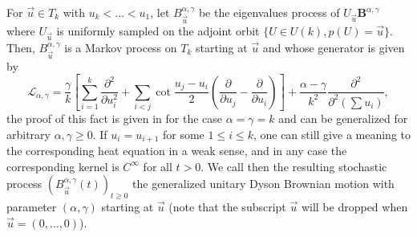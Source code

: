 \documentclass[10pt,11pt]{amsart}%
\begin{document}
For $\vec{u}\in  T_{k}$ with $u_k<\dots<u_1$, let $B^{\alpha,\gamma}_{\vec{u}}$ be the eigenvalues process of $U_{\vec{u}}\mathbf{B}^{\alpha,\gamma}$ where $U_{\vec{u}}$ is uniformly sampled on the adjoint orbit $\{U\in U(k), p(U)=\vec{u}\}$. Then, $B^{\alpha,\gamma}_{\vec{u}}$ is a Markov process on $ T_{k}$ starting at $\vec{u}$ and whose generator is given by 
\begin{equation}\label{eq:generator_Brownian_Motion}
\mathcal{L}_{\alpha,\gamma}=\frac{\gamma}{k}\left[\sum_{i=1}^k\frac{\partial^2}{\partial u_i^2}+\sum_{i<j}\cot \frac{u_j-u_i}{2}\left(\frac{\partial}{\partial u_j}-\frac{\partial}{\partial u_i}\right)\right]+\frac{\alpha-\gamma}{k^2}\frac{\partial^2}{\partial^2(\sum u_i)},
\end{equation}
the proof of this fact is given in \cite[Proposition 12.5.1]{Far} for the case $\alpha=\gamma=k$ and can be generalized for arbitrary $\alpha,\gamma\geq 0$. If $u_i=u_{i+1}$ for some $1\leq i\leq k$, one can still give a meaning to the corresponding heat equation in a weak sense, and in any case the corresponding kernel is $C^{\infty}$ for all $t>0$.  We call then the resulting stochastic process $(B^{\alpha,\gamma}_{\vec{u}}(t))_{t\geq 0}$ the generalized unitary Dyson Brownian motion with parameter $(\alpha,\gamma)$ starting at $\vec{u}$ (note that the subscript $\vec{u}$ will be dropped when $\vec{u}=(0,\ldots,0)$). 
\end{document}
